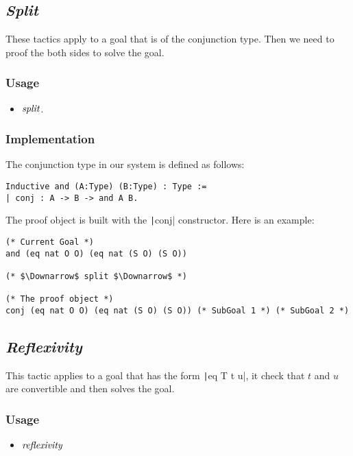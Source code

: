 \subsection{\it Split}
These tactics apply to a goal that is of the conjunction type. Then we need to proof the both sides to solve the goal.

\subsubsection*{Usage}
\begin{itemize}
\item ${\it split}$.
\end{itemize}

\subsubsection*{Implementation}
The conjunction type in our system is defined as follows:
\begin{center}
\begin{minipage}{\textwidth}
\begin{verbatim}
Inductive and (A:Type) (B:Type) : Type :=
| conj : A -> B -> and A B.   
\end{verbatim}
\end{minipage}
\end{center}

The proof object is built with the \texttt|conj| constructor.
Here is an example:
\begin{center}
\begin{minipage}{\textwidth}
\begin{verbatim}
(* Current Goal *)
and (eq nat O O) (eq nat (S O) (S O))

(* $\Downarrow$ split $\Downarrow$ *)

(* The proof object *)
conj (eq nat O O) (eq nat (S O) (S O)) (* SubGoal 1 *) (* SubGoal 2 *)
\end{verbatim}
\end{minipage}
\end{center}


\subsection{\it Reflexivity}
This tactic applies to a goal that has the form \texttt|eq T t u|, it check that $t$ and $u$ are convertible and then solves the goal.

\subsubsection*{Usage}
\begin{itemize}
\item ${\it reflexivity}$
\end{itemize}

